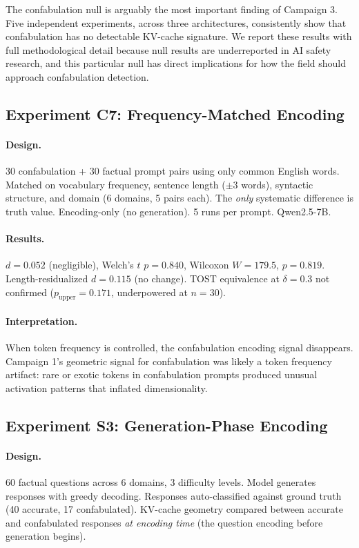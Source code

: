 The confabulation null is arguably the most important finding of Campaign 3. Five independent experiments, across three architectures, consistently show that confabulation has no detectable KV-cache signature. We report these results with full methodological detail because null results are underreported in AI safety research, and this particular null has direct implications for how the field should approach confabulation detection.

\subsection{Experiment C7: Frequency-Matched Encoding}
\label{sec:c7}

\paragraph{Design.} 30 confabulation + 30 factual prompt pairs using only common English words. Matched on vocabulary frequency, sentence length ($\pm 3$ words), syntactic structure, and domain (6 domains, 5 pairs each). The \emph{only} systematic difference is truth value. Encoding-only (no generation). 5 runs per prompt. Qwen2.5-7B.

\paragraph{Results.} $d = 0.052$ (negligible), Welch's $t$ $p = 0.840$, Wilcoxon $W = 179.5$, $p = 0.819$. Length-residualized $d = 0.115$ (no change). TOST equivalence at $\delta = 0.3$ not confirmed ($p_{\text{upper}} = 0.171$, underpowered at $n = 30$).

\paragraph{Interpretation.} When token frequency is controlled, the confabulation encoding signal disappears. Campaign 1's geometric signal for confabulation was likely a token frequency artifact: rare or exotic tokens in confabulation prompts produced unusual activation patterns that inflated dimensionality.

\subsection{Experiment S3: Generation-Phase Encoding}
\label{sec:s3}

\paragraph{Design.} 60 factual questions across 6 domains, 3 difficulty levels. Model generates responses with greedy decoding. Responses auto-classified against ground truth (40 accurate, 17 confabulated). KV-cache geometry compared between accurate and confabulated responses \emph{at encoding time} (the question encoding before generation begins).

